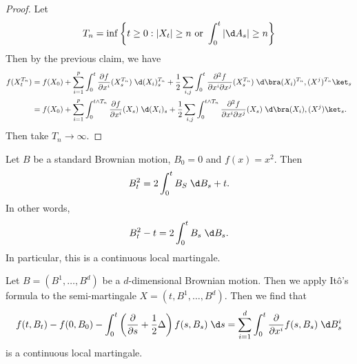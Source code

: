 \documentclass[a4paper]{article}
\begin{document}
\begin{proof}
  Let
  \[
    T_n = \inf \left\{t \geq 0: |X_t| \geq n\text{ or }\int_0^t |\d A_s| \geq n\right\}
  \]
  Then by the previous claim, we have
  \begin{align*}
    f(X_t^{T_n}) &= f(X_0) + \sum_{i = 1}^p \int_0^t \frac{\partial f}{\partial x^i} (X_s^{T_n})\;\d (X_i)_s^{T_n} + \frac{1}{2} \sum_{i, j} \int_0^t \frac{\partial^2 f}{\partial x^i \partial x^j} (X_s^{T_n})\;\d \bra (X_i)^{T_n}, (X^j)^{T_n}\ket_s\\
    &= f(X_0) + \sum_{i = 1}^p \int_0^{t \wedge T_n} \frac{\partial f}{\partial x^i} (X_s)\;\d (X_i)_s + \frac{1}{2} \sum_{i, j} \int_0^{t \wedge T_n} \frac{\partial^2 f}{\partial x^i \partial x^j} (X_s)\;\d \bra (X_i), (X^j)\ket_s.
  \end{align*}
  Then take $T_n \to \infty$.
\end{proof}

\begin{eg}
  Let $B$ be a standard Brownian motion, $B_0 = 0$ and $f(x) = x^2$. Then
  \[
    B_t^2 = 2 \int_0^t B_S \;\d B_s + t.
  \]
  In other words,
  \[
    B_t^2 - t = 2 \int_0^t B_s\;\d B_s.
  \]
  In particular, this is a continuous local martingale.
\end{eg}

\begin{eg}
  Let $B = (B^1, \ldots, B^d)$ be a $d$-dimensional Brownian motion. Then we apply It\^o's formula to the semi-martingale $X = (t, B^1, \ldots, B^d)$. Then we find that
  \[
    f(t, B_t) - f(0, B_0) - \int_0^t \left(\frac{\partial}{\partial s} + \frac{1}{2} \Delta\right) f(s, B_s) \;\d s = \sum_{i = 1}^d \int_0^t \frac{\partial}{\partial x^i} f(s, B_s)\;\d B_s^i
  \]
  is a continuous local martingale.
\end{eg}
\end{document}
